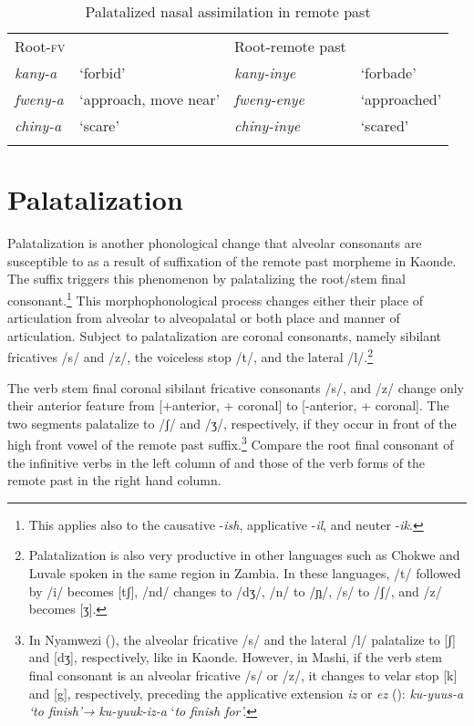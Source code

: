 \documentclass[output=paper]{langsci/langscibook}
\begin{document}
\begin{table}
\begin{tabular}{llll}
\lsptoprule
Root-\textsc{fv} &  & Root-remote past & \\
\textit{kany-a} & `forbid' & \textit{kany-inye} & `forbade' \\
\textit{fweny-a} & `approach, move near' & \textit{fweny-enye} & `approached' \\
\textit{chiny-a} & `scare' & \textit{chiny-inye} & `scared' \\

\lspbottomrule
\end{tabular}

\caption{Palatalized nasal assimilation in remote past}
\label{tab:8.kawasha}

 \end{table}


\section{Palatalization} \label{§3:palatalization.kawasha}

Palatalization is another phonological change that alveolar consonants are susceptible to as a result of suffixation of the remote past morpheme in Kaonde. The suffix triggers this phenomenon by palatalizing the root/stem final consonant.\footnote{This applies also to the causative -\textit{ish}, applicative -\textit{il}, and neuter -\textit{ik}.} This morphophonological process changes either their place of articulation from alveolar to alveopalatal or both place and manner of articulation. Subject to palatalization are coronal consonants, namely sibilant fricatives /s/ and /z/, the voiceless stop /t/, and the lateral /l/.\footnote{Palatalization is also very productive in other languages such as Chokwe and Luvale spoken in the same region in  Zambia. In these languages, /t/ followed by /i/ becomes [tʃ], /nd/ changes to /dʒ/, /n/ to /\href{http://en.wikipedia.org/wiki/Ɲ}{ɲ}/, /s/ to /ʃ/, and /z/ becomes [ʒ].} 

The verb stem final coronal sibilant fricative consonants /s/, and /z/ change only their anterior feature from [+anterior, + coronal] to [-anterior, + coronal]. The two segments palatalize to /ʃ/ and /ʒ/, respectively, if they occur in front of the high front vowel of the remote past suffix.\footnote{In Nyamwezi (\citealt{magangaschadeberg1992}), the alveolar fricative /s/ and the lateral /l/ palatalize to [ʃ] and [dʒ], respectively, like in Kaonde. However, in Mashi, if the verb stem final consonant is an alveolar fricative /s/ or /z/, it changes to velar stop [k] and [g], respectively, preceding the applicative extension \textit{iz} or \textit{ez} (\citealt{bashi2008}): \textit{ku-yuus-a }\textit{\textup{‘to finish’}}\textit{\textup{→}} \textit{ku-yuuk-iz-a} ‘\textit{\textup{to finish for’.}}} Compare the root final consonant of the infinitive verbs in the left column of  and those of the verb forms of the remote past in the right hand column.
\end{document}
